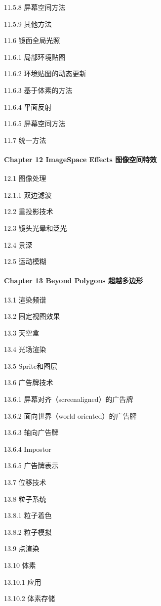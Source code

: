 \documentclass[
  paper=a4,
  ,captions=tableheading
]{scrartcl}
\begin{document}
11.5.8 屏幕空间方法

11.5.9 其他方法

11.6 镜面全局光照

11.6.1 局部环境贴图

11.6.2 环境贴图的动态更新

11.6.3 基于体素的方法

11.6.4 平面反射

11.6.5 屏幕空间方法

11.7 统一方法

\paragraph{Chapter 12 ImageSpace Effects
图像空间特效}\label{chapter-12-imagespace-effects-ux56feux50cfux7a7aux95f4ux7279ux6548}

12.1 图像处理

12.1.1 双边滤波

12.2 重投影技术

12.3 镜头光晕和泛光

12.4 景深

12.5 运动模糊

\paragraph{Chapter 13 Beyond Polygons
超越多边形}\label{chapter-13-beyond-polygons-ux8d85ux8d8aux591aux8fb9ux5f62}

13.1 渲染频谱

13.2 固定视图效果

13.3 天空盒

13.4 光场渲染

13.5 Sprite和图层

13.6 广告牌技术

13.6.1 屏幕对齐（screenaligned）的广告牌

13.6.2 面向世界（world oriented）的广告牌

13.6.3 轴向广告牌

13.6.4 Impostor

13.6.5 广告牌表示

13.7 位移技术

13.8 粒子系统

13.8.1 粒子着色

13.8.2 粒子模拟

13.9 点渲染

13.10 体素

13.10.1 应用

13.10.2 体素存储
\end{document}
